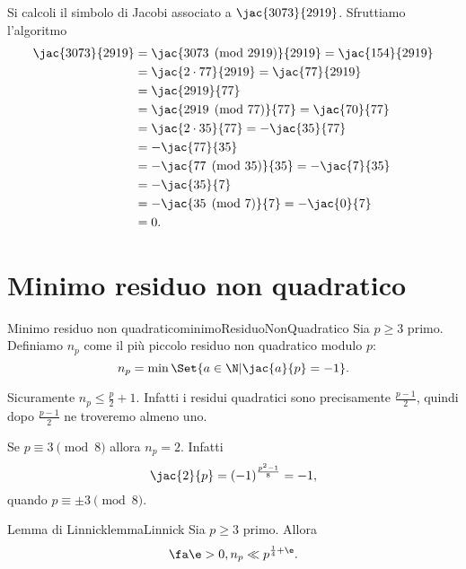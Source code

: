 \begin{ese}
	Si calcoli il simbolo di Jacobi associato a \(\jac{3073}{2919}\).
	Sfruttiamo l'algoritmo
	\[
		\begin{split}
			\jac{3073}{2919} & = \jac{3073 \pmod{2919}}{2919} = \jac{154}{2919}\\
			& = \jac{2 \cdot 77}{2919} = \jac{77}{2919}\\
			& = \jac{2919}{77}\\
			& = \jac{2919 \pmod{77}}{77} = \jac{70}{77}\\
			& = \jac{2 \cdot 35}{77} = -\jac{35}{77}\\
			& = -\jac{77}{35}\\
			& = -\jac{77 \pmod{35}}{35} = -\jac{7}{35}\\
			& = -\jac{35}{7}\\
			& = -\jac{35\pmod{7}}{7} = -\jac{0}{7}\\
			& = 0.
		\end{split}
	\]
\end{ese}
\section{Minimo residuo non quadratico}

\begin{defn}{Minimo residuo non quadratico}{minimoResiduoNonQuadratico}
	Sia \(p\ge 3\) primo.
	Definiamo \(n_p\) come il più piccolo residuo non quadratico modulo \(p\):
	\[
		n_p = \min \Set{a\in \N | \jac{a}{p}=-1}.
	\]
\end{defn}

\begin{oss}
	Sicuramente \(n_p \le \frac{p}{2}+1\).
	Infatti i residui quadratici sono precisamente \(\frac{p-1}{2}\), quindi dopo \(\frac{p-1}{2}\) ne troveremo almeno uno.
\end{oss}

\begin{oss}
	Se \(p\equiv 3 \pmod{8}\) allora \(n_p=2\).
	Infatti
	\[
		\jac{2}{p} = (-1)^{\frac{p^2-1}{8}} = -1,
	\]
	quando \(p\equiv \pm 3 \pmod{8}\).
\end{oss}

\begin{prop}{Lemma di Linnick}{lemmaLinnick}
	Sia \(p\ge 3\) primo.
	Allora
	\[
		\fa \e>0, n_p \ll p^{\frac{1}{4}+\e}.
	\]
\end{prop}

